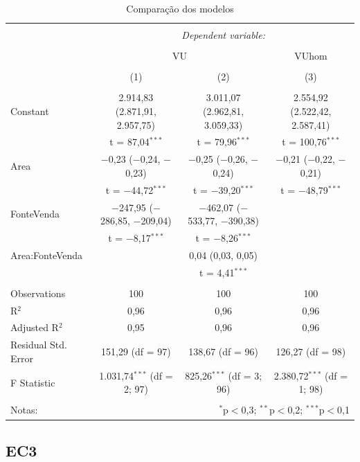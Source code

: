 \documentclass{article}
\begin{document}
\begin{table}[H] \centering 
  \caption{Comparação dos modelos} 
  \label{} 
\begin{tabular}{@{\extracolsep{5pt}}lccc} 
\\[-1.8ex]\hline 
\hline \\[-1.8ex] 
 & \multicolumn{3}{c}{\textit{Dependent variable:}} \\ 
\cline{2-4} 
\\[-1.8ex] & \multicolumn{2}{c}{VU} & VUhom \\ 
\\[-1.8ex] & (1) & (2) & (3)\\ 
\hline \\[-1.8ex] 
 Constant & 2.914,83 (2.871,91, 2.957,75) & 3.011,07 (2.962,81, 3.059,33) & 2.554,92 (2.522,42, 2.587,41) \\ 
  & t = 87,04$^{***}$ & t = 79,96$^{***}$ & t = 100,76$^{***}$ \\ 
  Area & $-$0,23 ($-$0,24, $-$0,23) & $-$0,25 ($-$0,26, $-$0,24) & $-$0,21 ($-$0,22, $-$0,21) \\ 
  & t = $-$44,72$^{***}$ & t = $-$39,20$^{***}$ & t = $-$48,79$^{***}$ \\ 
  FonteVenda & $-$247,95 ($-$286,85, $-$209,04) & $-$462,07 ($-$533,77, $-$390,38) &  \\ 
  & t = $-$8,17$^{***}$ & t = $-$8,26$^{***}$ &  \\ 
  Area:FonteVenda &  & 0,04 (0,03, 0,05) &  \\ 
  &  & t = 4,41$^{***}$ &  \\ 
 \hline \\[-1.8ex] 
Observations & 100 & 100 & 100 \\ 
R$^{2}$ & 0,96 & 0,96 & 0,96 \\ 
Adjusted R$^{2}$ & 0,95 & 0,96 & 0,96 \\ 
Residual Std. Error & 151,29 (df = 97) & 138,67 (df = 96) & 126,27 (df = 98) \\ 
F Statistic & 1.031,74$^{***}$ (df = 2; 97) & 825,26$^{***}$ (df = 3; 96) & 2.380,72$^{***}$ (df = 1; 98) \\ 
\hline 
\hline \\[-1.8ex] 
Notas: & \multicolumn{3}{r}{$^{*}$p$<$0,3; $^{**}$p$<$0,2; $^{***}$p$<$0,1} \\ 
\end{tabular} 
\end{table}

\hypertarget{ec3}{%
\subsection{EC3}\label{ec3}}
\end{document}

